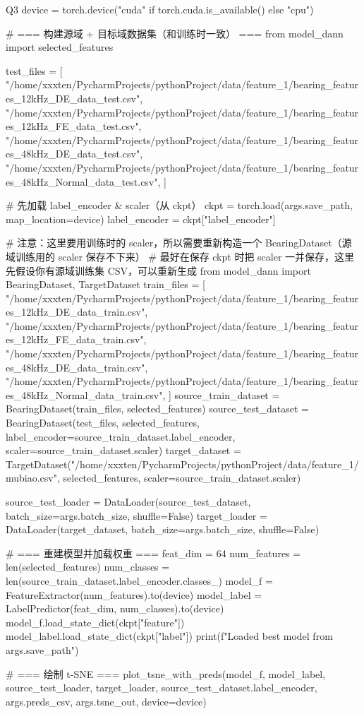 \begin{Python}{Q3}
    device = torch.device("cuda" if torch.cuda.is_available() else "cpu")

    # === 构建源域 + 目标域数据集（和训练时一致） ===
    from model_dann import selected_features

    test_files = [
        "/home/xxxten/PycharmProjects/pythonProject/data/feature_1/bearing_features_12kHz_DE_data_test.csv",
        "/home/xxxten/PycharmProjects/pythonProject/data/feature_1/bearing_features_12kHz_FE_data_test.csv",
        "/home/xxxten/PycharmProjects/pythonProject/data/feature_1/bearing_features_48kHz_DE_data_test.csv",
        "/home/xxxten/PycharmProjects/pythonProject/data/feature_1/bearing_features_48kHz_Normal_data_test.csv",
    ]

    # 先加载 label_encoder & scaler（从 ckpt）
    ckpt = torch.load(args.save_path, map_location=device)
    label_encoder = ckpt["label_encoder"]

    # 注意：这里要用训练时的 scaler，所以需要重新构造一个 BearingDataset（源域训练用的 scaler 保存不下来）
    # 最好在保存 ckpt 时把 scaler 一并保存，这里先假设你有源域训练集 CSV，可以重新生成
    from model_dann import BearingDataset, TargetDataset
    train_files = [
        "/home/xxxten/PycharmProjects/pythonProject/data/feature_1/bearing_features_12kHz_DE_data_train.csv",
        "/home/xxxten/PycharmProjects/pythonProject/data/feature_1/bearing_features_12kHz_FE_data_train.csv",
        "/home/xxxten/PycharmProjects/pythonProject/data/feature_1/bearing_features_48kHz_DE_data_train.csv",
        "/home/xxxten/PycharmProjects/pythonProject/data/feature_1/bearing_features_48kHz_Normal_data_train.csv",
    ]
    source_train_dataset = BearingDataset(train_files, selected_features)
    source_test_dataset = BearingDataset(test_files, selected_features,
                                         label_encoder=source_train_dataset.label_encoder,
                                         scaler=source_train_dataset.scaler)
    target_dataset = TargetDataset("/home/xxxten/PycharmProjects/pythonProject/data/feature_1/mubiao.csv", selected_features,
                                   scaler=source_train_dataset.scaler)

    source_test_loader = DataLoader(source_test_dataset, batch_size=args.batch_size, shuffle=False)
    target_loader = DataLoader(target_dataset, batch_size=args.batch_size, shuffle=False)

    # === 重建模型并加载权重 ===
    feat_dim = 64
    num_features = len(selected_features)
    num_classes = len(source_train_dataset.label_encoder.classes_)
    model_f = FeatureExtractor(num_features).to(device)
    model_label = LabelPredictor(feat_dim, num_classes).to(device)
    model_f.load_state_dict(ckpt["feature"])
    model_label.load_state_dict(ckpt["label"])
    print(f"Loaded best model from {args.save_path}")

    # === 绘制 t-SNE ===
    plot_tsne_with_preds(model_f, model_label,
                         source_test_loader, target_loader,
                         source_test_dataset.label_encoder,
                         args.preds_csv, args.tsne_out,
                         device=device)

\end{Python}

